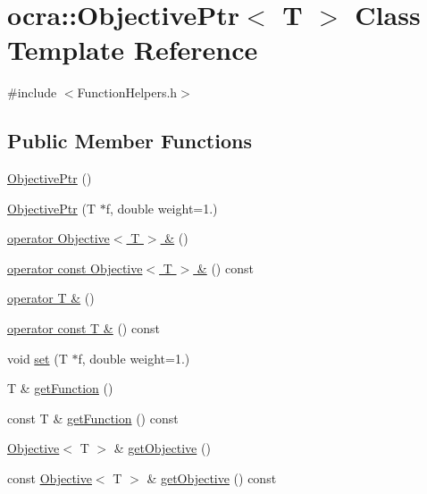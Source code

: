 \hypertarget{classocra_1_1ObjectivePtr}{}\section{ocra\+:\+:Objective\+Ptr$<$ T $>$ Class Template Reference}
\label{classocra_1_1ObjectivePtr}


{\ttfamily \#include $<$Function\+Helpers.\+h$>$}

\subsection*{Public Member Functions}
\begin{DoxyCompactItemize}
\item 
\hyperlink{classocra_1_1ObjectivePtr_ac82097858040b94f9beb50e038dd00d6}{Objective\+Ptr} ()
\item 
\hyperlink{classocra_1_1ObjectivePtr_ad8f830f8027859f3ac4daaf4e3bdc16f}{Objective\+Ptr} (T $\ast$f, double weight=1.)
\item 
\hyperlink{classocra_1_1ObjectivePtr_a9a4d3901e8ffabcce57254502858181c}{operator Objective$<$ T $>$ \&} ()
\item 
\hyperlink{classocra_1_1ObjectivePtr_ae84367282b1121834183047fbca27e0b}{operator const Objective$<$ T $>$ \&} () const 
\item 
\hyperlink{classocra_1_1ObjectivePtr_a318b3c461419f5bee6cb608729f02371}{operator T \&} ()
\item 
\hyperlink{classocra_1_1ObjectivePtr_a0aec02b78688451f66a578d53075670d}{operator const T \&} () const 
\item 
void \hyperlink{classocra_1_1ObjectivePtr_aa65486dfbb8ccd72bfc629a06b967254}{set} (T $\ast$f, double weight=1.)
\item 
T \& \hyperlink{classocra_1_1ObjectivePtr_a8e8083b5a5583ec3fb24d002791ac1dd}{get\+Function} ()
\item 
const T \& \hyperlink{classocra_1_1ObjectivePtr_a1d8e9987d476de3cc81338d1ededc214}{get\+Function} () const 
\item 
\hyperlink{classocra_1_1Objective}{Objective}$<$ T $>$ \& \hyperlink{classocra_1_1ObjectivePtr_a0069561ac9c93a92ff2e7156267550ce}{get\+Objective} ()
\item 
const \hyperlink{classocra_1_1Objective}{Objective}$<$ T $>$ \& \hyperlink{classocra_1_1ObjectivePtr_a113d0b46f4148152359d7d07d5d6ef5a}{get\+Objective} () const 
\end{DoxyCompactItemize}


